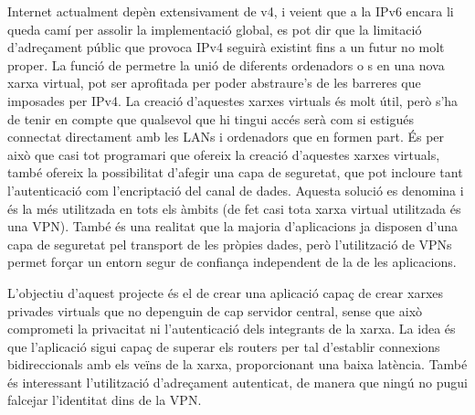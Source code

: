 Internet actualment depèn extensivament de v4, i veient que a la IPv6 encara li queda camí per assolir la implementació global, es pot dir que la limitació d'adreçament públic que provoca IPv4 seguirà existint fins a un futur no molt proper. La funció de permetre la unió de diferents ordenadors o s en una nova xarxa virtual, pot ser aprofitada per poder abstraure's de les barreres que imposades per IPv4. La creació d'aquestes xarxes virtuals és molt útil, però s'ha de tenir en compte que qualsevol que hi tingui accés serà com si estigués connectat directament amb les LANs i ordenadors que en formen part. És per això que casi tot programari que ofereix la creació d'aquestes xarxes virtuals, també ofereix la possibilitat d'afegir una capa de seguretat, que pot incloure tant l'autenticació com l'encriptació del canal de dades. Aquesta solució es denomina  i és la més utilitzada en tots els àmbits (de fet casi tota xarxa virtual utilitzada és una VPN).
També és una realitat que la majoria d'aplicacions ja disposen d'una capa de seguretat pel transport de les pròpies dades, però l'utilització de VPNs permet forçar un entorn segur de confiança independent de la de les aplicacions. 

L'objectiu d'aquest projecte és el de crear una aplicació capaç de crear xarxes privades virtuals que no depenguin de cap servidor central, sense que això comprometi la privacitat ni l'autenticació dels integrants de la xarxa. La idea és que l'aplicació sigui capaç de superar els routers  per tal d'establir connexions bidireccionals amb els veïns de la xarxa, proporcionant una baixa latència. També és interessant l'utilització d'adreçament autenticat, de manera que ningú no pugui falcejar l'identitat dins de la VPN.

